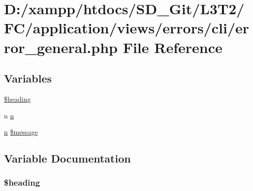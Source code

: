 \hypertarget{application_2views_2errors_2cli_2error__general_8php}{}\section{D\+:/xampp/htdocs/\+S\+D\+\_\+\+Git/\+L3\+T2/\+F\+C/application/views/errors/cli/error\+\_\+general.php File Reference}
\label{application_2views_2errors_2cli_2error__general_8php}
\subsection*{Variables}
\begin{DoxyCompactItemize}
\item 
\hyperlink{application_2views_2errors_2cli_2error__general_8php_a196169be7715d466e3310388b096598c}{\$heading}
\item 
n \hyperlink{application_2views_2errors_2cli_2error__general_8php_ace0fd03cd383f20ce6ea63247a207294}{n}
\item 
\hyperlink{_admin_2application_2views_2errors_2cli_2error__general_8php_ace0fd03cd383f20ce6ea63247a207294}{n} \hyperlink{application_2views_2errors_2cli_2error__general_8php_aaba2b6aee423b3b5e46000f90b4c8c7f}{\$message}
\end{DoxyCompactItemize}


\subsection{Variable Documentation}
\hypertarget{application_2views_2errors_2cli_2error__general_8php_a196169be7715d466e3310388b096598c}{}
\subsubsection[{\$heading}]{\setlength{\rightskip}{0pt plus 5cm}\$heading}\label{application_2views_2errors_2cli_2error__general_8php_a196169be7715d466e3310388b096598c}
\hypertarget{application_2views_2errors_2cli_2error__general_8php_aaba2b6aee423b3b5e46000f90b4c8c7f}{}
